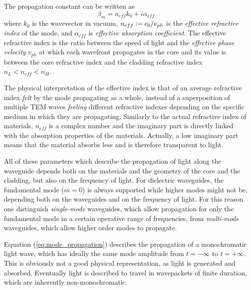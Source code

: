 The propagation constant can be written as
\begin{equation}
\beta_m = n_{eff} k_0 + i \alpha_{eff}
\end{equation}
where $k_0$ is the wavevector in vacuum, $n_{eff} \vcentcolon= c_0/v_{ph}$ is the \textit{effective refractive index} of the mode, and $\alpha_{eff}$ is \textit{effective absorption coefficient}.
The effective refractive index is the ratio between the speed of light and the \textit{effective phase velocity} $v_{ph}$ at which each wavefront propagates in the core and its value is between the core refractive index and the cladding refractive index $n_L < n_{eff} < n_H$.

The physical interpretation of the effective index is that of an average refractive index \textit{felt} by the mode propagating as a whole, instead of a superposition of multiple TEM waves \textit{feeling} different refractive indexes depending on the specific medium in which they are propagating.
Similarly to the actual refractive index of materials, $n_{eff}$ is a complex number and the imaginary part is directly linked with the absorption properties of the materials.
Actually, a low imaginary part means that the material absorbs less and is therefore transparent to light.

All of these parameters which describe the propagation of light along the waveguide depends both on the materials and the geometry of the core and the cladding, but also on the frequency of light.
For dielectric waveguides, the fundamental mode ($m=0$) is always supported while higher modes might not be, depending both on the waveguides and on the frequency of light.
For this reason one distinguish \textit{single-mode} waveguides, which allow propagation for only the fundamental mode in a certain operative range of frequencies, from \textit{multi-mode} waveguides, which allow higher order modes to propagate.

Equation (\ref{eq:mode_propagation}) describes the propagation of a monochromatic light wave, which has ideally the same mode amplitude from $t=-\infty$ to $t=+\infty$.
This is obviously not a good physical representation, as light is generated and absorbed.
Eventually light is described to travel in wavepackets of finite duration, which are inherently non-monochromatic.

